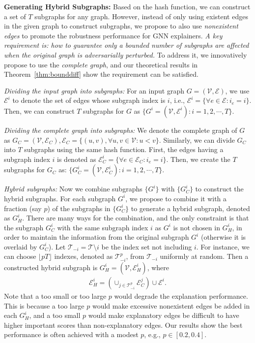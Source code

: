 {\bf Generating Hybrid Subgraphs:} Based on the hash function, we can construct a set of $T$ subgraphs for any graph. However, instead of only using existent edges in the given graph to construct subgraphs, we propose to also use \emph{nonexistent edges} to promote the robustness performance for GNN explainers. \emph{A key requirement is: how to guarantee only a bounded number of subgraphs are affected when the original graph is adversarially perturbed.} To address it, we innovatively propose to use the \emph{complete graph},
and our theoretical results in Theorem~\ref{thm:bounddiff} show the requirement can be satisfied.

\emph{Dividing the input graph into subgraphs:} 
For an input graph $G=(\mathcal{V},\mathcal{E})$, we use 
$\mathcal{E}^i$ to denote the set of edges whose subgraph index is $i$, i.e., 
$\mathcal{E}^i = \{\forall e \in \mathcal{E}: i_e= i \}.$ 
Then, we can construct $T$ subgraphs for $G$ as $\{ {G}^i = (\mathcal{V}, \mathcal{E}^i): i=1,2,\cdots, T\}$. 

\emph{Dividing the complete graph into subgraphs:} 
We denote the complete graph of $G$ as $G_C = (\mathcal{V}, \mathcal{E}_C), \mathcal{E}_{C}=\{(u,v), \forall u,v\in \mathcal{V}: u<v\}$. Similarly,  we can divide  $G_C$ into $T$ subgraphs using the same hash function. 
First, the edges having a subgraph index $i$ is denoted as $\mathcal{E}^{i}_{C} = \{\forall e \in \mathcal{E}_{C}: i_{e}=i\}$. Then, we create the $T$ subgraphs for $G_C$ as: $\{{G}_C^i = (\mathcal{V}, \mathcal{E}_C^i): i=1,2,\cdots, T\}$. 

\emph{Hybrid subgraphs:} Now we combine subgraphs $\{G^i\}$ with $\{G_C^i\}$ to construct the hybrid subgraphs. 
For each subgraph $G^i$, we propose to combine it with a fraction (say $p$) of the subgraphs in $\{G_C^i\}$ to generate a hybrid subgraph, denoted as $G_H^i$. There are many ways for the combination, and the only constraint is that the subgraph $G_C^i$ with the same subgraph index $i$ as $G^i$ is not chosen in  $G_H^i$, in order to maintain the information from the original subgraph $G^i$ (otherwise it is overlaid by $G_C^i$). 
Let $\mathcal{T}_{-i} = \mathcal{T}\setminus{i}$ be the index set not including $i$. For instance, we can choose $\lfloor pT\rfloor$ indexes, denoted as $\mathcal{T}_{-i}^p$, from $\mathcal{T}_{-i}$ uniformly at random. 
Then a constructed hybrid subgraph is  $G_H^i = (\mathcal{V}, {\mathcal{E}}_H^{i})$, where 
\begin{align}\label{eq:hybrid}
{\mathcal{E}}_H^{i} =   (\cup_{j \in \mathcal{T}_{-i}^p} \mathcal{E}^{j}_{C})\cup \mathcal{E}^{i}.  
\end{align}
Note that a too small or too large $p$ would degrade the explanation performance. This is because a too large $p$ would make excessive nonexistent edges be added in each $G_H^i$, and a too small $p$ would make explanatory edges be difficult to have higher important scores than non-explanatory edges. Our results show the best performance is often achieved with a modest $p$, e.g., $p \in [0.2,0.4]$.

